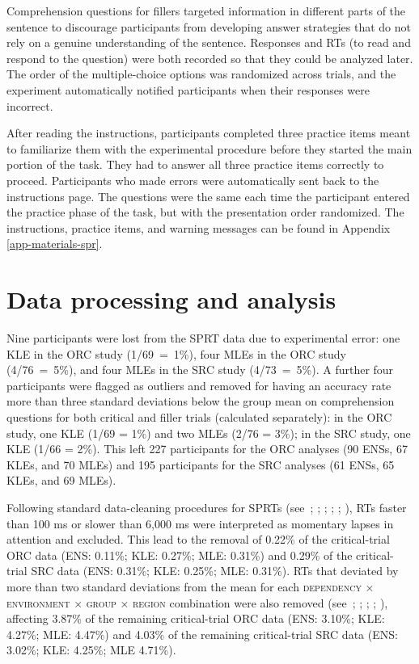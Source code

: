 \noindent Comprehension questions for fillers targeted information in different parts of the sentence to discourage participants from developing answer strategies that do not rely on a genuine understanding of the sentence. Responses and RTs (to read and respond to the question) were both recorded so that they could be analyzed later. The order of the multiple-choice options was randomized across trials, and the experiment automatically notified participants when their responses were incorrect. 

After reading the instructions, participants completed three practice items meant to familiarize them with the experimental procedure before they started the main portion of the task. They had to answer all three practice items correctly to proceed. Participants who made errors were automatically sent back to the instructions page. The questions were the same each time the participant entered the practice phase of the task, but with the presentation order randomized. The instructions, practice items, and warning messages can be found in Appendix \ref{app-materials-spr}.

\section{Data processing and analysis}\label{spr-analysis}

Nine participants were lost from the SPRT data due to experimental error: one KLE in the ORC study (1/69~=~1\%), four MLEs in the ORC study (4/76~=~5\%), and four MLEs in the SRC study (4/73~=~5\%). A further four participants were flagged as outliers and removed for having an accuracy rate more than three standard deviations below the group mean on comprehension questions for both critical and filler trials (calculated separately): in the ORC study, one KLE (1/69 = 1\%) and two MLEs (2/76 = 3\%); in the SRC study, one KLE (1/66 = 2\%). This left 227 participants for the ORC analyses (90 ENSs, 67 KLEs, and 70 MLEs) and 195 participants for the SRC analyses (61 ENSs, 65 KLEs, and 69 MLEs).

Following standard data-cleaning procedures for SPRTs (see~\cite{hammerly2022}; \cite{hofmeister2011}; \cite{jackson2010}; \cite{mifka-profozic.etal2020}; \cite{morgan.etal2020}; \cite{santi.etal2019}), RTs faster than 100 ms or slower than 6,000 ms were interpreted as momentary lapses in attention and excluded. This lead to the removal of 0.22\% of the critical-trial ORC data (ENS: 0.11\%; KLE: 0.27\%; MLE: 0.31\%) and 0.29\% of the critical-trial SRC data (ENS: 0.31\%; KLE: 0.25\%; MLE: 0.31\%). RTs that deviated by more than two standard deviations from the mean for each \textsc{dependency × environment × group × region} combination were also removed (see~\cite{hofmeister2011}; \cite{hofmeister.norcliffe2013}; \cite{jackson2010}; \cite{mifka-profozic.etal2020}; \cite{santi.etal2019}), affecting 3.87\% of the remaining critical-trial ORC data (ENS: 3.10\%; KLE: 4.27\%; MLE: 4.47\%) and 4.03\% of the remaining critical-trial SRC data (ENS: 3.02\%; KLE: 4.25\%; MLE 4.71\%).

